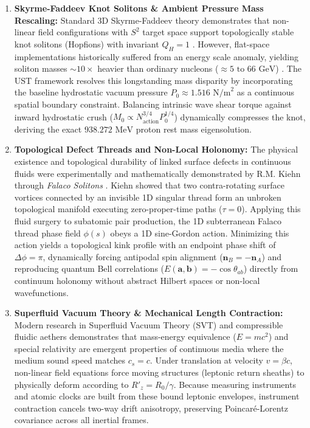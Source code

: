 \documentclass[11pt,a4paper]{article}
\begin{document}
	\begin{enumerate}
		\item \textbf{Skyrme-Faddeev Knot Solitons \& Ambient Pressure Mass Rescaling:} 
		Standard 3D Skyrme-Faddeev theory demonstrates that non-linear field configurations with $S^2$ target space support topologically stable knot solitons (Hopfions) with invariant $Q_H = 1$ \cite{faddeev_niemi_1997, hietarinta_2000}. However, flat-space implementations historically suffered from an energy scale anomaly, yielding soliton masses $\sim 10\times$ heavier than ordinary nucleons ($\approx 5 \text{ to } 66\text{ GeV}$) \cite{hietarinta_2000}. The UST framework resolves this longstanding mass disparity by incorporating the baseline hydrostatic vacuum pressure $P_0 \approx 1.516\text{ N/m}^2$ as a continuous spatial boundary constraint. Balancing intrinsic wave shear torque against inward hydrostatic crush ($M_0 \propto N_{\text{action}}^{3/4} P_0^{1/4}$) dynamically compresses the knot, deriving the exact $938.272\text{ MeV}$ proton rest mass eigensolution.
		
		\item \textbf{Topological Defect Threads and Non-Local Holonomy:}
		The physical existence and topological durability of linked surface defects in continuous fluids were experimentally and mathematically demonstrated by R.M. Kiehn through \textit{Falaco Solitons} \cite{kiehn_falaco_2001}. Kiehn showed that two contra-rotating surface vortices connected by an invisible 1D singular thread form an unbroken topological manifold executing zero-proper-time paths ($\tau = 0$). Applying this fluid surgery to subatomic pair production, the 1D subterranean Falaco thread phase field $\phi(s)$ obeys a 1D sine-Gordon action. Minimizing this action yields a topological kink profile with an endpoint phase shift of $\Delta \phi = \pi$, dynamically forcing antipodal spin alignment ($\mathbf{n}_B = -\mathbf{n}_A$) and reproducing quantum Bell correlations ($E(\mathbf{a},\mathbf{b}) = -\cos\theta_{ab}$) directly from continuum holonomy without abstract Hilbert spaces or non-local wavefunctions.
		
		\item \textbf{Superfluid Vacuum Theory \& Mechanical Length Contraction:}
		Modern research in Superfluid Vacuum Theory (SVT) \cite{volovik2003} and compressible fluidic aethers \cite{verozub2020} demonstrates that mass-energy equivalence ($E=mc^2$) and special relativity are emergent properties of continuous media where the medium sound speed matches $c_s = c$. Under translation at velocity $v = \beta c$, non-linear field equations force moving structures (leptonic return sheaths) to physically deform according to $R'_z = R_0 / \gamma$. Because measuring instruments and atomic clocks are built from these bound leptonic envelopes, instrument contraction cancels two-way drift anisotropy, preserving Poincaré-Lorentz covariance across all inertial frames.
		

\end{enumerate}
\end{document}
